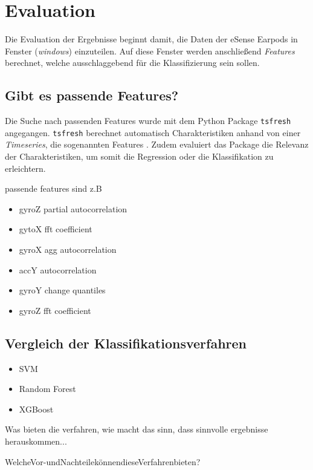 
\chapter{Evaluation}
\label{ch:Evaluation}
Die Evaluation der Ergebnisse beginnt damit, die Daten der eSense Earpods in Fenster (\textit{windows}) einzuteilen.
Auf diese Fenster werden anschließend \textit{Features} berechnet, welche ausschlaggebend für die Klassifizierung sein sollen.

\section{Gibt es passende Features?}
Die Suche nach passenden Features wurde mit dem Python Package \texttt{tsfresh} angegangen.
\texttt{tsfresh} berechnet automatisch Charakteristiken anhand von einer \textit{Timeseries}, die sogenannten Features .
Zudem evaluiert das Package die Relevanz der Charakteristiken, um somit die Regression oder die Klassifikation zu erleichtern.


passende features sind z.B
\begin{itemize}
    \item gyroZ partial autocorrelation
    \item gytoX fft coefficient
    \item gyroX agg autocorrelation
    \item accY autocorrelation
    \item gyroY change quantiles 
    \item gyroZ fft coefficient
\end{itemize}


\section{Vergleich der Klassifikationsverfahren}
\begin{itemize}
    \item SVM
    \item Random Forest
    \item XGBoost
\end{itemize}

Was bieten die verfahren, wie macht das sinn, dass sinnvolle ergebnisse herauskommen...

WelcheVor-undNachteilekönnendieseVerfahrenbieten?


